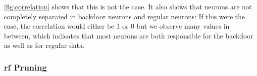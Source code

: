 \documentclass[10pt,sigconf,letterpaper,dvipsnames]{acmart}
\newcommand\note[2]{{\color{#1}#2}}
\newcommand\todo[1]{{\note{red}{TODO: #1}}}
\begin{document}
\autoref{fig:correlation} shows that this is not the case. It also shows that neurons are not completely separated in backdoor neurons and regular neurons: If this were the case, the correlation would either be 1 or 0 but we observe many values in between, which indicates that most neurons are both responsible for the backdoor as well as for regular data.  

\subsubsection{\gls{rf} Pruning}
\end{document}
